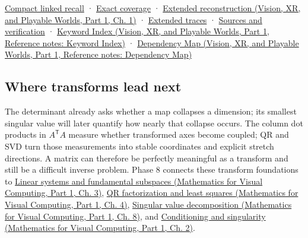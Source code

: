 \hyperref[appendix-68f22c734be3]{Compact linked recall} · \hyperref[appendix-fd090d982a15-phase-7---parts-601-700]{Exact coverage} · \href{../07-Vision-XR-and-Playable-Worlds-P01/main.pdf\#nameddest=02-foundations-ii-ch039-phase-7---transform-reconstruction-proofs}{Extended reconstruction (Vision, XR, and Playable Worlds, Part 1, Ch. 1)} · \hyperref[appendix-92ff77d4dfdc-phase-7---the-moving-panel-tracebook]{Extended traces} · \hyperref[appendix-a103e7846d21-phase-7---source-analysis-and-verification]{Sources and verification} · \href{../07-Vision-XR-and-Playable-Worlds-P01/main.pdf\#nameddest=appendix-a6d556a4ef50}{Keyword Index (Vision, XR, and Playable Worlds, Part 1, Reference notes: Keyword Index)} · \href{../07-Vision-XR-and-Playable-Worlds-P01/main.pdf\#nameddest=appendix-4ad47bdd269a}{Dependency Map (Vision, XR, and Playable Worlds, Part 1, Reference notes: Dependency Map)}

\subsection{Where transforms lead next}\label{02-foundations-ii-ch038-where-transforms-lead-next}

\hypertarget{02-foundations-ii-ch038-where-transforms-lead-next}{}

The determinant already asks whether a map collapses a dimension; its smallest singular value will later quantify how nearly that collapse occurs. The column dot products in \(A^\mathsf T A\) measure whether transformed axes become coupled; QR and SVD turn those measurements into stable coordinates and explicit stretch directions. A matrix can therefore be perfectly meaningful as a transform and still be a difficult inverse problem. Phase 8 connects these transform foundations to \href{../02-Mathematics-for-Visual-Computing-P01/main.pdf\#nameddest=01-foundations-i-ch019-a-system-is-an-intersection-of-constraints}{Linear systems and fundamental subspaces (Mathematics for Visual Computing, Part 1, Ch. 3)}, \href{../02-Mathematics-for-Visual-Computing-P01/main.pdf\#nameddest=01-foundations-i-ch020-reflections-and-plane-rotations-build-qr-without-losing-lengths}{QR factorization and least squares (Mathematics for Visual Computing, Part 1, Ch. 4)}, \href{../02-Mathematics-for-Visual-Computing-P01/main.pdf\#nameddest=02-foundations-ii-ch024-full-thin-and-compact-shapes-for-tall-and-wide-matrices}{Singular value decomposition (Mathematics for Visual Computing, Part 1, Ch. 8)}, and \href{../02-Mathematics-for-Visual-Computing-P01/main.pdf\#nameddest=01-foundations-i-ch018-an-inverse-can-exist-and-still-amplify-uncertainty}{Conditioning and singularity (Mathematics for Visual Computing, Part 1, Ch. 2)}.

